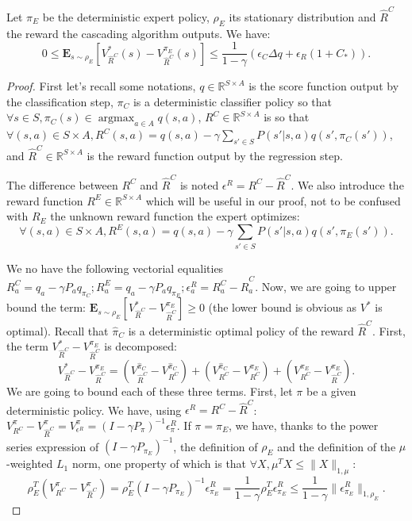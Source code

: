 \documentclass{llncs}
\newcommand{\E}{\mathbf{E}}
\newcommand{\argmax}{\operatorname*{argmax}} %
\begin{document}
\begin{theorem}
\label{thm}
Let $\pi_E$ be the deterministic expert policy, $\rho_E$ its stationary distribution and $\hat{R}^C$ the reward the cascading algorithm outputs. We have:
\begin{equation}
0\leq\E_{s\sim\rho_E}[V^*_{\hat{R}^C}(s)-V^{\pi_E}_{\hat{R}^C}(s)]\leq \frac{1}{1-\gamma}\left(\epsilon_C\Delta q +\epsilon_R(1+C_*)\right).
\end{equation}
\end{theorem}
\begin{proof}
First let's recall some notations, $q\in\mathbb{R}^{S\times A}$ is the score function output by the classification step, $\pi_C$ is a deterministic classifier policy so that $\forall s \in S,\pi_C(s)\in\argmax_{a\in A}q(s,a)$, $R^C\in\mathbb{R}^{S\times A}$ is so that $\forall (s,a)\in S\times A, R^C(s,a)=q(s,a) -\gamma\sum_{s'\in S}P(s'|s,a)q(s',\pi_C(s'))$,
and $\hat{R}^C\in\mathbb{R}^{S\times A}$ is the reward function output by the regression step.

The difference between $R^C$ and $\hat{R}^C$ is noted $\epsilon^R=R^C-\hat{R}^C$.
We also introduce the reward function $R^E\in\mathbb{R}^{S\times A}$ which will be useful in our proof, not to be confused with $R_E$ the unknown reward function the expert optimizes:
\begin{equation}
\forall (s,a)\in S\times A, R^E(s,a)=q(s,a) -\gamma\sum_{s'\in S}P(s'|s,a)q(s',\pi_E(s')).
\end{equation}

We no have the following vectorial equalities $
R^C_a=q_a-\gamma P_aq_{\pi_C} ;
R^E_a=q_a-\gamma P_aq_{\pi_E};
\epsilon^R_a=R^C_a-\hat{R}^C_a$.
Now, we are going to upper bound the term: $\E_{s\sim\rho_E}[V^*_{\hat{R}^C}-V^{\pi_E}_{\hat{R}^C}]\geq0$ (the lower bound is obvious as $V^*$ is optimal).
Recall that $\hat{\pi}_C$ is a deterministic optimal policy of the reward $\hat{R}^C$. First, the term $V^*_{\hat{R}^C}-V^{\pi_E}_{\hat{R}^C}$ is decomposed:
\begin{equation}
V^*_{\hat{R}^C}-V^{\pi_E}_{\hat{R}^C}=(V^{\hat{\pi}_C}_{\hat{R}^C}-V^{\hat{\pi}_C}_{R^C})+(V^{\hat{\pi}_C}_{R^C}-V^{\pi_E}_{R^C})+(V^{\pi_E}_{R^C}-V^{\pi_E}_{\hat{R}^C}).
\end{equation}
We are going to bound each of these three terms. First, let $\pi$ be a given deterministic policy. We have, using $\epsilon^R = R^C - \hat R^C$:
$V^{\pi}_{R^C}-V^{\pi}_{\hat{R}^C}=V^{\pi}_{\epsilon^R}=(I-\gamma P_\pi)^{-1}\epsilon^R_{\pi}$.
If $\pi=\pi_E$, we have, thanks to the power series expression of $(I-\gamma P_{\pi_E})^{-1}$, the definition of $\rho_E$ and the definition of the $\mu$-weighted $L_1$ norm, one property of which is that $\forall X, \mu^TX \leq \|X\|_{1,\mu}$:
\begin{equation}
  \rho_E^T(V^{\pi}_{R^C}-V^{\pi}_{\hat{R}^C})=\rho_E^T(I-\gamma P_{\pi_E})^{-1}\epsilon^R_{\pi_E}=\frac{1}{1-\gamma}\rho_E^T\epsilon^R_{\pi_E}\leq\frac{1}{1-\gamma}\|\epsilon^R_{\pi_E}\|_{1,\rho_E}.\end{equation}


\end{proof}
\end{document}
